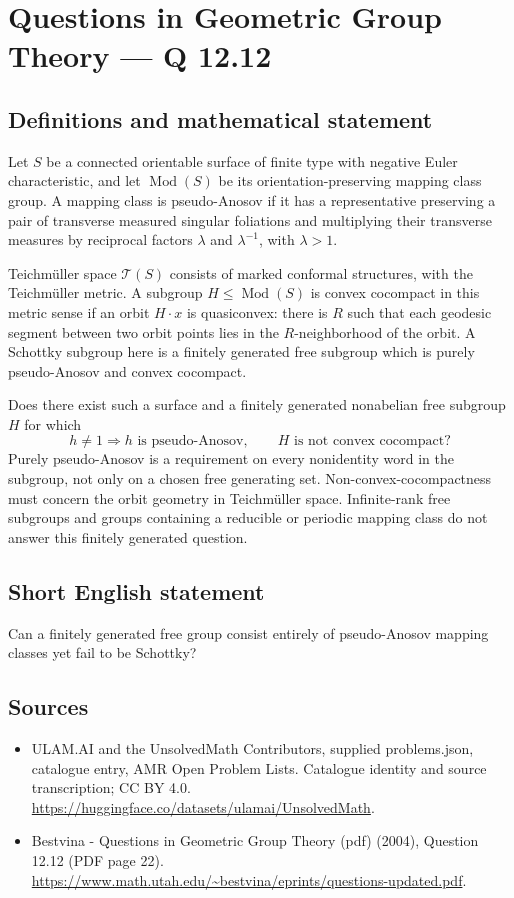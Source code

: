 \documentclass[11pt,a4paper]{article}
\begin{document}
\section*{Questions in Geometric Group Theory — Q 12.12}\label{statement}

\subsection{Definitions and mathematical statement}
Let $S$ be a connected orientable surface of finite type with negative Euler characteristic, and let $\operatorname{Mod}(S)$ be its orientation-preserving mapping class group. A mapping class is pseudo-Anosov if it has a representative preserving a pair of transverse measured singular foliations and multiplying their transverse measures by reciprocal factors $\lambda$ and $\lambda^{-1}$, with $\lambda>1$.

Teichm\"uller space $\mathcal T(S)$ consists of marked conformal structures, with the Teichm\"uller metric. A subgroup $H\leq\operatorname{Mod}(S)$ is convex cocompact in this metric sense if an orbit $H\cdot x$ is quasiconvex: there is $R$ such that each geodesic segment between two orbit points lies in the $R$-neighborhood of the orbit. A Schottky subgroup here is a finitely generated free subgroup which is purely pseudo-Anosov and convex cocompact.

Does there exist such a surface and a finitely generated nonabelian free subgroup $H$ for which
\[
 h\ne1\Longrightarrow h\text{ is pseudo-Anosov},
 \qquad H\text{ is not convex cocompact}?
\]
Purely pseudo-Anosov is a requirement on every nonidentity word in the subgroup, not only on a chosen free generating set. Non-convex-cocompactness must concern the orbit geometry in Teichm\"uller space. Infinite-rank free subgroups and groups containing a reducible or periodic mapping class do not answer this finitely generated question.
\subsection{Short English statement}
Can a finitely generated free group consist entirely of pseudo-Anosov mapping classes yet fail to be Schottky?
\subsection{Sources}
\begin{itemize}
\item[S1] ULAM.AI and the UnsolvedMath Contributors, supplied problems.json, catalogue entry, AMR Open Problem Lists. Catalogue identity and source transcription; CC BY 4.0.
\url{https://huggingface.co/datasets/ulamai/UnsolvedMath}.
\item[S2] Bestvina - Questions in Geometric Group Theory (pdf) (2004), Question 12.12 (PDF page 22). 
\url{https://www.math.utah.edu/~bestvina/eprints/questions-updated.pdf}.
\end{itemize}
\end{document}
